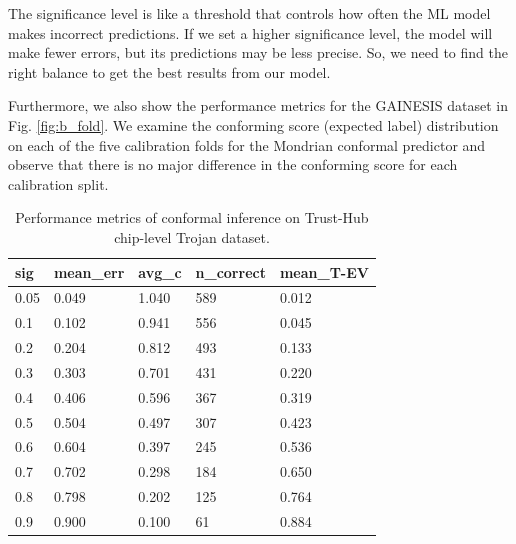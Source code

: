 
The significance level is like a threshold that controls how often the ML model makes incorrect predictions. If we set a higher significance level, the model will make fewer errors, but its predictions may be less precise. So, we need to find the right balance to get the best results from our model.

Furthermore, we also show the performance metrics for the GAINESIS dataset in Fig. \ref{fig:b_fold}. We examine the conforming score (expected label) distribution on each of the five calibration folds for the Mondrian conformal predictor and observe that there is no major difference in the conforming score for each calibration split.

\begin{table}[t]
\centering
\caption{Performance metrics of conformal inference on Trust-Hub chip-level Trojan dataset.}
\begin{tabular}{lllll}
\hline
\textbf{sig} & \textbf{mean\_err} & \textbf{avg\_c} & \textbf{n\_correct} & \textbf{mean\_T-EV} \\ \hline
0.05         & 0.049                 & 1.040           & 589                 & 0.012               \\ \hline
0.1          & 0.102                 & 0.941           & 556               & 0.045               \\ \hline
0.2          & 0.204                 & 0.812           & 493             & 0.133               \\ \hline
0.3          & 0.303                 & 0.701           & 431             & 0.220               \\ \hline
0.4          & 0.406                 & 0.596           & 367            & 0.319               \\ \hline
0.5          & 0.504                 & 0.497           & 307           & 0.423               \\ \hline
0.6          & 0.604                 & 0.397           & 245             & 0.536               \\ \hline
0.7          & 0.702                 & 0.298           & 184            & 0.650               \\ \hline
0.8          & 0.798                 & 0.202           & 125           & 0.764               \\ \hline
0.9          & 0.900                 & 0.100           & 61         & 0.884               \\ \hline
\end{tabular}
\label{tab:performance}
\end{table}

